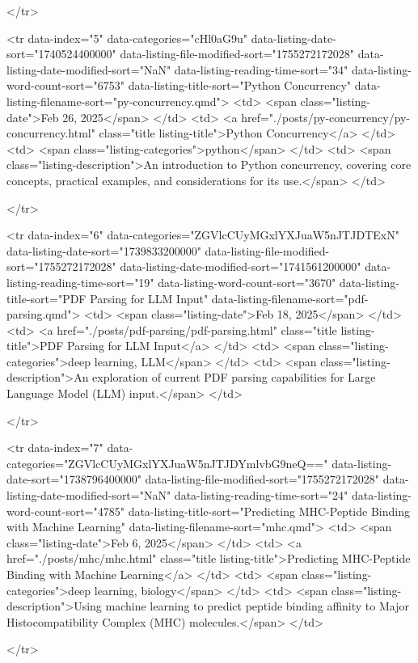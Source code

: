 </tr>

<tr data-index="5" data-categories="cHl0aG9u" data-listing-date-sort="1740524400000" data-listing-file-modified-sort="1755272172028" data-listing-date-modified-sort="NaN" data-listing-reading-time-sort="34" data-listing-word-count-sort="6753" data-listing-title-sort="Python Concurrency" data-listing-filename-sort="py-concurrency.qmd">
<td>
<span class="listing-date">Feb 26, 2025</span>
</td>
<td>
<a href="./posts/py-concurrency/py-concurrency.html" class="title listing-title">Python Concurrency</a>
</td>
<td>
<span class="listing-categories">python</span>
</td>
<td>
<span class="listing-description">An introduction to Python concurrency, covering core concepts, practical examples, and considerations for its use.</span>
</td>

</tr>

<tr data-index="6" data-categories="ZGVlcCUyMGxlYXJuaW5nJTJDTExN" data-listing-date-sort="1739833200000" data-listing-file-modified-sort="1755272172028" data-listing-date-modified-sort="1741561200000" data-listing-reading-time-sort="19" data-listing-word-count-sort="3670" data-listing-title-sort="PDF Parsing for LLM Input" data-listing-filename-sort="pdf-parsing.qmd">
<td>
<span class="listing-date">Feb 18, 2025</span>
</td>
<td>
<a href="./posts/pdf-parsing/pdf-parsing.html" class="title listing-title">PDF Parsing for LLM Input</a>
</td>
<td>
<span class="listing-categories">deep learning, LLM</span>
</td>
<td>
<span class="listing-description">An exploration of current PDF parsing capabilities for Large Language Model (LLM) input.</span>
</td>

</tr>

<tr data-index="7" data-categories="ZGVlcCUyMGxlYXJuaW5nJTJDYmlvbG9neQ==" data-listing-date-sort="1738796400000" data-listing-file-modified-sort="1755272172028" data-listing-date-modified-sort="NaN" data-listing-reading-time-sort="24" data-listing-word-count-sort="4785" data-listing-title-sort="Predicting MHC-Peptide Binding with Machine Learning" data-listing-filename-sort="mhc.qmd">
<td>
<span class="listing-date">Feb 6, 2025</span>
</td>
<td>
<a href="./posts/mhc/mhc.html" class="title listing-title">Predicting MHC-Peptide Binding with Machine Learning</a>
</td>
<td>
<span class="listing-categories">deep learning, biology</span>
</td>
<td>
<span class="listing-description">Using machine learning to predict peptide binding affinity to Major Histocompatibility Complex (MHC) molecules.</span>
</td>

</tr>

